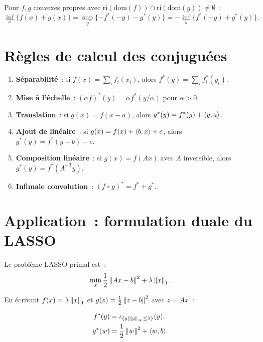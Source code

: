 \begin{corollaire}
Pour $f, g$ convexes propres avec $\mathrm{ri}(\mathrm{dom}(f)) \cap
\mathrm{ri}(\mathrm{dom}(g)) \neq \emptyset$~:
\[
    \inf_x \{f(x) + g(x)\} = \sup_y \{-f^*(-y) - g^*(y)\}
    = -\inf_y \{f^*(-y) + g^*(y)\}.
\]
\end{corollaire}

\section{R\`egles de calcul des conjugu\'ees}

\begin{proposition}
\begin{enumerate}
    \item \textbf{S\'eparabilit\'e}~: si $f(x) = \sum_i f_i(x_i)$, alors
          $f^*(y) = \sum_i f_i^*(y_i)$.
    \item \textbf{Mise \`a l'\'echelle}~: $(\alpha f)^*(y) = \alpha f^*(y/\alpha)$
          pour $\alpha > 0$.
    \item \textbf{Translation}~: si $g(x) = f(x - a)$, alors $g^*(y) = f^*(y) + \langle y, a \rangle$.
    \item \textbf{Ajout de lin\'eaire}~: si $g(x) = f(x) + \langle b, x \rangle + c$,
          alors $g^*(y) = f^*(y - b) - c$.
    \item \textbf{Composition lin\'eaire}~: si $g(x) = f(Ax)$ avec $A$ inversible,
          alors $g^*(y) = f^*(A^{-T}y)$.
    \item \textbf{Infimale convolution}~: $(f \mathop{\square} g)^* = f^* + g^*$.
\end{enumerate}
\end{proposition}

\section{Application~: formulation duale du LASSO}

Le probl\`eme LASSO primal est~:
\[
    \min_x \frac{1}{2}\left\| Ax - b \right\|^2 + \lambda\left\| x \right\|_1.
\]

En \'ecrivant $f(x) = \lambda\left\| x \right\|_1$ et $g(z) = \frac{1}{2}\left\| z - b \right\|^2$
avec $z = Ax$~:

\begin{align*}
    f^*(y) &= \iota_{\{y \mid \left\| y \right\|_\infty \leq \lambda\}}(y), \\
    g^*(w) &= \frac{1}{2}\left\| w \right\|^2 + \langle w, b \rangle.
\end{align*}

